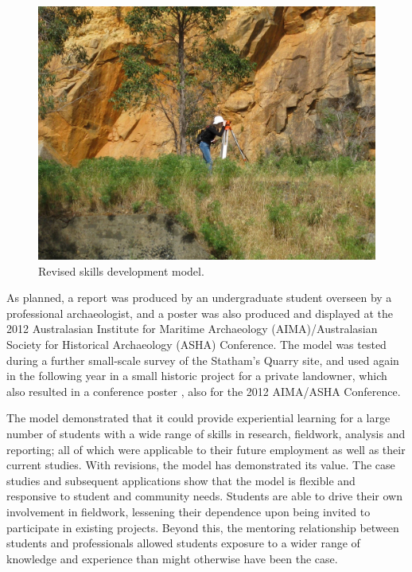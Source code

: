 \documentclass{ijsra}
\begin{document}
   	\begin{figure} %
   		\includegraphics[width=\linewidth]{figures/Fyfe-Figure03}
   		\caption{Revised skills development model.}
   		\centering
   		\label{fig:Fyfe-Figure03}
   	\end{figure}

As planned, a report \parencite{murszewskiwinter2012} was produced by an undergraduate student overseen by a professional archaeologist, 
and a poster \parencite{murszewski2012} was also produced and displayed at the 2012 Australasian Institute for Maritime Archaeology (AIMA)/Australasian Society for Historical Archaeology (ASHA) Conference. 
The model was tested during a further small-scale survey of the Statham’s Quarry site, and used again in the following year in a small historic project for a private landowner, which also resulted in a conference poster \parencite{busher2012}, also for the 2012 AIMA/ASHA Conference.

The model demonstrated that it could provide experiential learning for a large number of students with a wide range of skills in research, fieldwork, analysis and reporting; all of which were applicable to their future employment as well as their current studies. 
With revisions, the model has demonstrated its value. The case studies and subsequent applications show that the model is flexible and responsive to student and community needs. 
Students are able to drive their own involvement in fieldwork, lessening their dependence upon being invited to participate in existing projects. Beyond this, the mentoring relationship between students and professionals allowed students exposure to a wider range of knowledge and experience than might otherwise have been the case.
\end{document}
